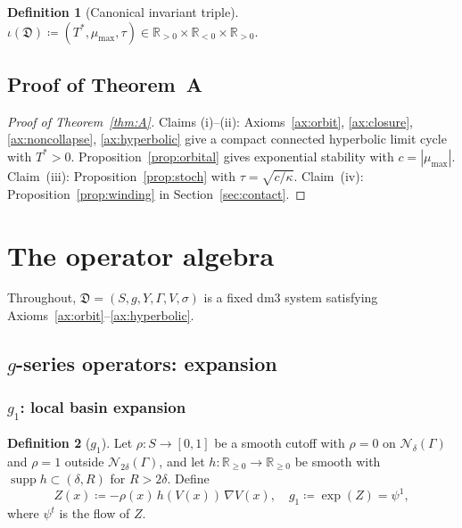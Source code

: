 \documentclass[12pt, oneside]{book}
\theoremstyle{plain}
\theoremstyle{definition}
\newtheorem{definition}{Definition}[section]
\theoremstyle{remark}
\newcommand{\R}{\mathbb{R}}
\newcommand{\dm}{\mathfrak{D}}
\newcommand{\Orb}{\Gamma}
\newcommand{\cN}{\mathcal{N}}
\newcommand{\abs}[1]{\left|#1\right|}
\DeclareMathOperator{\supp}{supp}
\begin{document}
\begin{definition}[Canonical invariant triple]\label{def:triple}
$\iota(\dm)\coloneqq(T^*,\mu_{\max},\tau)\in
\R_{>0}\times\R_{<0}\times\R_{>0}$.
\end{definition}

\subsection{Proof of Theorem~A}

\begin{proof}[Proof of Theorem~\ref{thm:A}]
Claims (i)--(ii): Axioms~\ref{ax:orbit}, \ref{ax:closure},
\ref{ax:noncollapse}, \ref{ax:hyperbolic} give a compact connected
hyperbolic limit cycle with $T^*>0$. Proposition~\ref{prop:orbital}
gives exponential stability with $c=\abs{\mu_{\max}}$.
Claim~(iii): Proposition~\ref{prop:stoch} with $\tau=\sqrt{c/\kappa}$.
Claim~(iv): Proposition~\ref{prop:winding} in
Section~\ref{sec:contact}.
\end{proof}

\section{The operator algebra}\label{sec:operators}

Throughout, $\dm=(S,g,Y,\Orb,V,\sigma)$ is a fixed dm3 system
satisfying Axioms~\ref{ax:orbit}--\ref{ax:hyperbolic}.

\subsection{\texorpdfstring{$g$}{g}-series operators: expansion}
\label{subsec:g}

\subsubsection{\texorpdfstring{$g_1$}{g1}: local basin expansion}

\begin{definition}[$g_1$]\label{def:g1}
Let $\rho\colon S\to[0,1]$ be a smooth cutoff with $\rho=0$ on
$\cN_\delta(\Orb)$ and $\rho=1$ outside $\cN_{2\delta}(\Orb)$,
and let $h\colon\R_{\ge 0}\to\R_{\ge 0}$ be smooth with
$\supp h\subset(\delta,R)$ for $R>2\delta$. Define
\[
  Z(x)\coloneqq -\rho(x)\,h(V(x))\,\nabla V(x),\quad
  g_1\coloneqq\exp(Z)=\psi^1,
\]
where $\psi^t$ is the flow of $Z$.
\end{definition}
\end{document}
